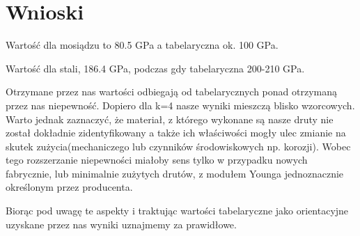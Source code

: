 \documentclass{article}
\begin{document}
\section{Wnioski}
Wartość dla mosiądzu to 80.5 GPa a tabelaryczna ok. 100 GPa.

Wartość dla stali, 186.4 GPa, podczas gdy tabelaryczna 200-210 GPa.

Otrzymane przez nas wartości odbiegają od tabelarycznych ponad otrzymaną przez nas niepewność. Dopiero dla k=4 nasze wyniki mieszczą blisko wzorcowych. Warto jednak zaznaczyć, że materiał, z którego wykonane są nasze druty nie został dokładnie zidentyfikowany a także ich właściwości mogły ulec zmianie na skutek zużycia(mechaniczego lub czynników środowiskowych np. korozji). Wobec tego rozszerzanie niepewności miałoby sens tylko w przypadku nowych fabrycznie, lub minimalnie zużytych drutów, z modułem Younga jednoznacznie określonym przez producenta.

Biorąc pod uwagę te aspekty i traktując wartości tabelaryczne jako orientacyjne uzyskane przez nas wyniki uznajmemy za prawidłowe.





\end{document}
